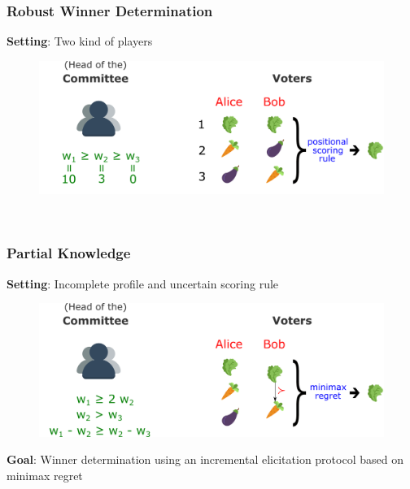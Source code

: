 \documentclass{beamer}
\newcommand{\ppref}{\succ^\text{p}}
\begin{document}
\begin{frame}
\frametitle{Robust Winner Determination}
	\textbf{Setting}: Two kind of players
\begin{figure}
	\includegraphics[scale=0.38]{setting.png}
\end{figure}~\vspace*{15px}
\end{frame}

\begin{frame}
	\frametitle{Partial Knowledge}
	\textbf{Setting}: Incomplete profile and uncertain scoring rule
	\begin{figure}
		\includegraphics[scale=0.38]{setting2.png}
	\end{figure}
	\textbf{Goal}: Winner determination using an incremental elicitation protocol based on minimax regret
\end{frame}

\end{document}
